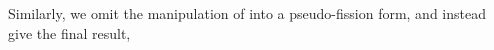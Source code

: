 Similarly, we omit the manipulation of  into a pseudo-fission form, and instead give the final result,
%
